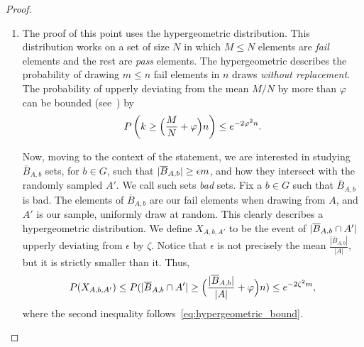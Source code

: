 \begin{lemma}
\begin{enumerate}[label=(\alph*), ref=\alph*]
            \end{enumerate}
            \begin{proof}
            \begin{enumerate}[label=(\alph*), ref=\alph*]
                \item The proof of this point uses the hypergeometric distribution.
                    This distribution works on a set of size $N$ in which $M \leq N$ elements are \emph{fail} elements
                    and the rest are \emph{pass} elements.
                    The hypergeometric describes the probability of drawing $m \leq n$ fail elements in $n$ draws
                    \emph{without replacement}.
                    The probability of upperly deviating from the mean $M/N$ by more than $\varphi$ can be bounded
                    (see~\cite{hypergeometric_tail_inequalities_ending_the_insanity, the_tail_od_the_hypergeometric_distribution})
                    by
                    \begin{equation} \label{eq:hypergeometric_bound}
                        P\left( k \geq \Bigl( \frac{M}{N} + \varphi \Bigr) n \right) \leq e^{-2 \varphi^2 n}.
                    \end{equation}

                    Now, moving to the context of the statement, we are interested in studying $\overline{B}_{A,b}$ sets,
                    for $b\in G$, such that $| \overline{B}_{A,b} | \geq \epsilon m$, and how they intersect with the
                    randomly sampled $A'$.
                    We call such sets \emph{bad} sets.
                    Fix a $b\in G$ such that $\overline{B}_{A,b}$ is bad.
                    The elements of $\overline{B}_{A,b}$ are our fail elements when drawing from $A$, and
                    $A'$ is our sample, uniformly draw at random.
                    This clearly describes a hypergeometric distribution.
                    We define $X_{A,b,A'}$ to be the event of $| \overline{B}_{A,b} \cap A' |$ upperly
                    deviating from $\epsilon$ by $\zeta$.
                    Notice that $\epsilon$ is not precisely the mean $\frac{|\overline{B}_{A,b}|}{|A|}$, but it is strictly
                    smaller than it.
                    Thus,
                    \[
                        P( X_{A,b,A'} ) \leq P( | \overline{B}_{A,b} \cap A' | \geq
                            \Bigl( \frac{|\overline{B}_{A,b}|}{|A|} + \varphi \Bigr) n ) \leq e^{-2\zeta^2 m},
                    \]
                    where the second inequality follows~\eqref{eq:hypergeometric_bound}.


\end{enumerate}
\end{proof}
\end{lemma}
